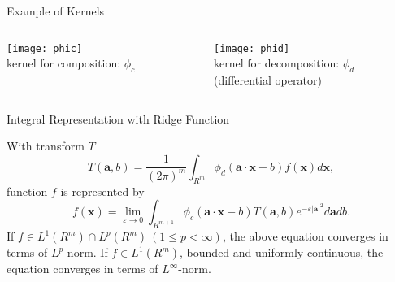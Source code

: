 \documentclass[fleqn,aspectratio=1610]{beamer}
\begin{document}
\begin{frame}[label={sec:orgaa42202}]{Example of Kernels}
\begin{columns}
\begin{column}{0.5\columnwidth}
\begin{center}
\texttt{[image: phic]}\\[0pt]
kernel for composition: \(\phi_c\) \\[0pt]
\phantom{(differential operator)}
\end{center}
\end{column}
\begin{column}{0.5\columnwidth}
\begin{center}
\texttt{[image: phid]}\\[0pt]
kernel for decomposition: \(\phi_d\) \\[0pt]
(differential operator)
\end{center}
\end{column}
\end{columns}
\end{frame}

\begin{frame}[label={sec:orgdbab0c7}]{Integral Representation with Ridge Function}
\begin{theorem}[NM 1996]\label{sec:org52e8849}
With transform \(T\) 
\begin{equation}
  T(\boldsymbol{a},b)
  =\frac{1}{(2\pi)^{m}}
  \int_{R^{m}}\phi_{d}(\boldsymbol{a}\cdot\boldsymbol{x}-b)
  f(\boldsymbol{x})d\boldsymbol{x},
\end{equation}
function \(f\) is represented by
\begin{equation}
  f(\boldsymbol{x})
  =\lim_{\varepsilon\to0}\int_{R^{m+1}}
  \phi_{c}(\boldsymbol{a}\cdot\boldsymbol{x}-b)
  T(\boldsymbol{a},b)e^{-\varepsilon|\boldsymbol{a}|^2}d\boldsymbol{a}db.
\end{equation}
If \(f\in L^{1}(R^{m})\cap L^{p}(R^{m})\ (1\leq p<\infty)\),
the above equation converges in terms of \(L^{p}\)-norm.
If \(f\in L^{1}(R^{m})\), bounded and uniformly continuous,
the equation converges in terms of \(L^{\infty}\)-norm.
\end{theorem}
\end{frame}
\end{document}
